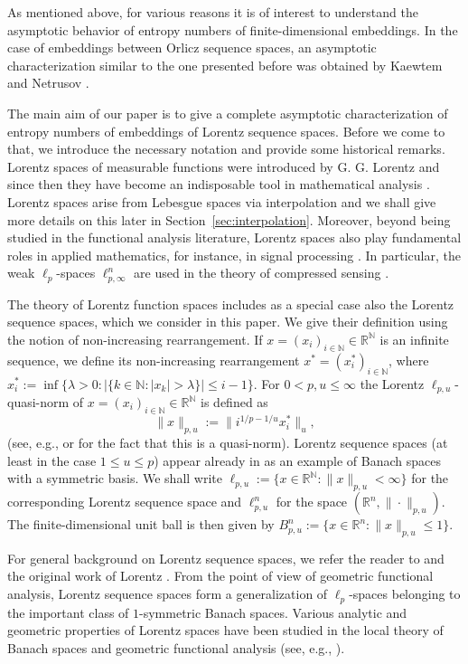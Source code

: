 \documentclass[a4paper,12pt]{article}
\theoremstyle{definition}
\newcommand{\IN}{\mathbb{N}}
\newcommand{\IR}{\mathbb{R}}
\begin{document}
As mentioned above, for various reasons it is of interest to understand the asymptotic behavior of entropy numbers of finite-dimensional embeddings. 
In the case of embeddings between Orlicz sequence spaces, an asymptotic characterization similar to the one presented before was obtained by Kaewtem and Netrusov \cite[Theorem 4.2]{KN21}.

The main aim of our paper is to give a complete asymptotic characterization of entropy numbers of embeddings of Lorentz sequence spaces. Before we come to that, we introduce the necessary notation
and provide some historical remarks. Lorentz spaces of measurable functions were introduced by G. G. Lorentz \cite{L1950, L1951} and since then they have become an indisposable tool
in mathematical analysis \cite{stein1971}. 
Lorentz spaces arise from Lebesgue spaces via interpolation and we shall give more details on this later in Section~\ref{sec:interpolation}. Moreover, beyond being studied in the functional analysis
literature, Lorentz spaces also play fundamental roles in applied mathematics, for instance, in signal processing \cite{CT06}. In particular, the weak $\ell_p$-spaces $\ell_{p,\infty}^n$ are used
in the theory of compressed sensing \cite{FR13}. 

The theory of Lorentz function spaces includes as a special case also the Lorentz sequence spaces, which we consider in this paper.
We give their definition using the notion of non-increasing rearrangement. If $x=(x_i)_{i\in\IN}\in\IR^{\IN}$ is an infinite sequence, we define its non-increasing rearrangement $x^*=(x^*_i)_{i\in\IN}$, where
$x_i^*:=\inf\{\lambda>0\colon |\{k\in\IN\colon |x_k|> \lambda\}|\le i-1\}$.
For $0< p, u\le \infty$ the Lorentz $\ell_{p,u}$-quasi-norm of $x=(x_i)_{i\in\IN}\in\IR^{\IN}$ is defined as 
\[
\|x\|_{p,u}:=\|i^{1/p-1/u}x_i^*\|_u,
\]
(see, e.g., \cite[(1.4.9)]{Grafakos} or \cite[Lemma 2.9]{LN2023} for the fact that this is a quasi-norm).
Lorentz sequence spaces (at least in the case $1\le u\le p$) appear already in \cite[Section I.3.a]{LiTz} as an example of Banach spaces with a symmetric basis.
We shall write $\ell_{p,u}:=\{x\in\IR^{\IN}\colon \|x\|_{p,u}<\infty\}$ for the corresponding Lorentz sequence space
and $\ell_{p,u}^n$ for the space $(\IR^n,\|\cdot\|_{p,u})$. The finite-dimensional unit ball is then given by $B_{p,u}^n:=\{x\in\IR^n\colon \|x\|_{p,u}\le 1\}$.

For general background on Lorentz sequence spaces, we refer the reader to \cite{AEP1988,CL2019} and the original work of Lorentz \cite{L1951}.
From the point of view of geometric functional analysis, Lorentz sequence spaces form a generalization of $\ell_p$-spaces belonging to the important class of $1$-symmetric Banach spaces.
Various analytic and geometric properties of Lorentz spaces have been studied in the local theory of Banach spaces and geometric functional analysis
(see, e.g., \cite{A2023,DV20,F2023,KPS23,KM04,LN2023,P2021,R1982,Sch1989}).
\end{document}
